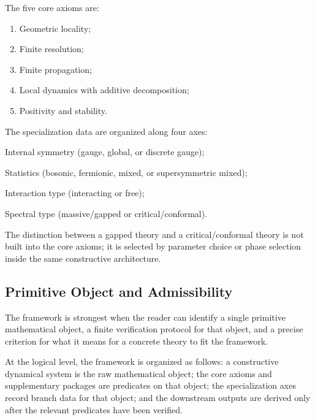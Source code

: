 \documentclass[12pt,a4paper]{article}
\theoremstyle{plain}
\theoremstyle{definition}
\theoremstyle{remark}
\begin{document}
The five core axioms are:

\begin{enumerate}[nosep]
\item Geometric locality;
\item Finite resolution;
\item Finite propagation;
\item Local dynamics with additive decomposition;
\item Positivity and stability.
\end{enumerate}

The specialization data are organized along four axes:

\begin{description}[nosep]
\item[Axis A:] Internal symmetry (gauge, global, or discrete gauge);
\item[Axis B:] Statistics (bosonic, fermionic, mixed, or
  supersymmetric mixed);
\item[Axis C:] Interaction type (interacting or free);
\item[Axis D:] Spectral type (massive/gapped or critical/conformal).
\end{description}

The distinction between a gapped theory and a critical/conformal
theory is not built into the core axioms; it is selected by parameter
choice or phase selection inside the same constructive architecture.

\subsection{Primitive Object and Admissibility}

The framework is strongest when the reader can identify a single
primitive mathematical object, a finite verification protocol for that
object, and a precise criterion for what it means for a concrete
theory to fit the framework.

At the logical level, the framework is organized as follows: a
constructive dynamical system is the raw mathematical object; the core
axioms and supplementary packages are predicates on that object; the
specialization axes record branch data for that object; and the
downstream outputs are derived only after the relevant predicates have
been verified.
\end{document}
